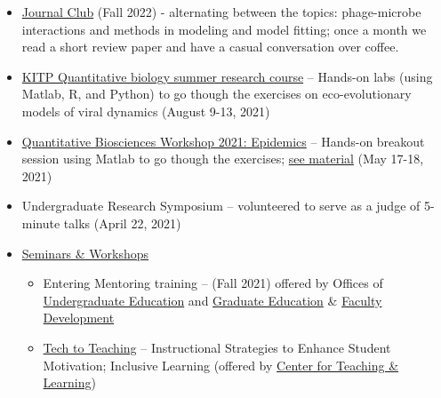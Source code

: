 \documentclass[a4paper,10pt]{article}
\newlength{\cvcolumngapwidth}
\newlength{\cvleftcolumnwidth}
\newlength{\cvrightcolumnwidth}
\newcommand{\cvdurationstyle}[1]{{\small\cvdurationfont\textcolor{cvdurationcolor}{#1}}}
\newlength{\cvafteritemskipamount}
\newlength{\cvparskip}
\newcommand{\cvitem}[2]{
            \begin{minipage}[t]{\cvleftcolumnwidth}
                \raggedleft #1
            \end{minipage}%
            \hspace{\cvcolumngapwidth}%
            \begin{minipage}[t]{\cvrightcolumnwidth}
                \setlength{\parskip}{\cvparskip} #2
            \end{minipage}
        
            \vspace{\cvafteritemskipamount}
        }
\begin{document}
        \cvitem{
            \cvdurationstyle{}
        }{	
        	\newpage
        \begin{itemize}[leftmargin=*]	
               \item \href{https://docs.google.com/spreadsheets/d/1vShFs_Td_geBw8N3Ll6b7dOMDl3bdHjoqBhE8TupWd4/edit?usp=sharing}{Journal Club} (Fall 2022) - alternating between the topics: phage-microbe interactions and methods in modeling and model fitting; once a month we read a short review paper and have a casual conversation over coffee.
                   \item \href{https://www.kitp.ucsb.edu/qbio}{KITP Quantitative biology summer research course} -- Hands-on labs (using Matlab, R, and Python) to go though the exercises on eco-evolutionary models of viral dynamics  (August 9-13, 2021)
    	\item \href{https://workshop2021.qbios.gatech.edu/schedule/}{Quantitative Biosciences Workshop 2021: Epidemics} -- Hands-on breakout session using Matlab to go though the exercises; \href{https://github.com/Jeremy-D-Harris/qBiosWorkshop2021_TeamOutbreak}{see material} (May 17-18, 2021)
    	\item Undergraduate Research Symposium -- volunteered to serve as a judge of 5-minute talks (April 22, 2021)
	\item {\underline{Seminars \& Workshops}}
		\begin{itemize}[leftmargin=*]
		\item Entering Mentoring training -- (Fall 2021) offered by Offices of \href{https://oue.gatech.edu/}{Undergraduate Education} and \href{https://grad.gatech.edu/}{Graduate Education} \& \href{https://faculty.gatech.edu/office-faculty-professional-development-programs-and-services}{Faculty Development}
		\item \href{https://ctl.gatech.edu/content/tech-teaching-0}{Tech to Teaching} -- Instructional Strategies to Enhance Student Motivation; Inclusive Learning (offered by \href{https://ctl.gatech.edu/}{Center for Teaching \& Learning}) 
		\end{itemize}
	\end{itemize}
	}
\end{document}
